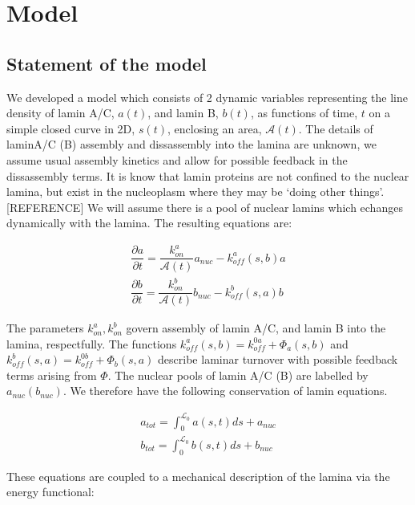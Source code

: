 \section{Model}

\subsection{Statement of the model} We developed a model which consists of 2 dynamic variables representing the line density of lamin A/C, $a(t)$, and lamin B, $b(t)$, as functions of time, $t$ on a simple closed curve in 2D, $s(t)$, enclosing an area, $\mathcal{A}(t)$. The details of laminA/C (B)  assembly and dissassembly into the lamina are unknown, we assume usual assembly kinetics and allow for possible feedback in the dissassembly terms. It is know that lamin proteins are not confined to the nuclear lamina, but exist in the nucleoplasm where they may be `doing other things'. [REFERENCE] We will assume there is a pool of nuclear lamins which echanges dynamically with the lamina. The resulting equations are:

\begin{align}
\dfrac{\partial a}{\partial t} = \dfrac{k_{on}^a}{\mathcal{A}(t)} a_{nuc} - k_{off}^a (s,b)a\\[7pt]
\dfrac{\partial b}{\partial t} = \dfrac{k_{on}^b}{\mathcal{A}(t)}b_{nuc} - k_{off}^b  (s,a)b \label{eq::laminaKinetics}
\end{align}

The parameters $k_{on}^a , k_{on}^b$  govern assembly of lamin A/C, and lamin B into the lamina, respectfully. The functions $k_{off}^a (s,b) = k_{off}^{0a} + \Phi_a(s,b)$ and $ k_{off}^b(s,a)  = k_{off}^{0b} + \Phi_b(s,a)$ describe laminar turnover with possible feedback terms arising from $\Phi$. The nuclear pools of lamin A/C (B) are labelled by $a_{nuc} (b_{nuc})$. We therefore have the following conservation of lamin equations. 

\begin{align}
a_{tot}= \int_0^{\mathcal{L}_0} a(s,t) ds + a_{nuc}\\
b_{tot} = \int_0^{\mathcal{L}_0} b(s,t) ds + b_{nuc}
\end{align}



These equations are coupled to a mechanical description of the lamina via the energy functional:


